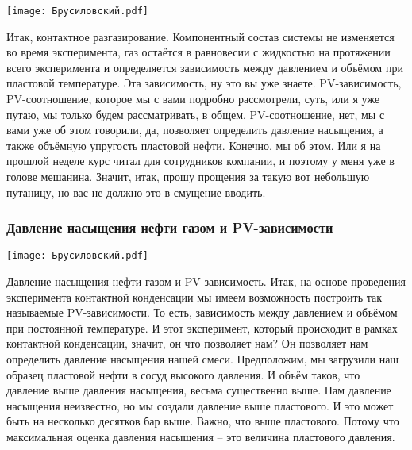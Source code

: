 \documentclass[main.tex]{subfiles}
\begin{document}
\begin{center}
\texttt{[image: Брусиловский.pdf]}
\end{center}

Итак, контактное разгазирование.
Компонентный состав системы не изменяется во время эксперимента, газ остаётся в равновесии с жидкостью на протяжении всего эксперимента и определяется зависимость между давлением и объёмом при пластовой температуре.
Эта зависимость, ну это вы уже знаете.
PV-зависимость, PV-соотношение, которое мы с вами подробно рассмотрели, суть, или я уже путаю, мы только будем рассматривать, в общем, PV-соотношение, нет, мы с вами уже об этом говорили, да, позволяет определить давление насыщения, а также объёмную упругость пластовой нефти.
Конечно, мы об этом.
Или я на прошлой неделе курс читал для сотрудников компании, и поэтому у меня уже в голове мешанина.
Значит, итак, прошу прощения за такую вот небольшую путаницу, но вас не должно это в смущение вводить.

\subsubsection{Давление насыщения нефти газом и PV-зависимости}

\begin{center}
\texttt{[image: Брусиловский.pdf]}
\end{center}

Давление насыщения нефти газом и PV-зависимость.
Итак, на основе проведения эксперимента контактной конденсации мы имеем возможность построить так называемые PV-зависимости.
То есть, зависимость между давлением и объёмом при постоянной температуре.
И этот эксперимент, который происходит в рамках контактной конденсации, значит, он что позволяет нам?
Он позволяет нам определить давление насыщения нашей смеси.
Предположим, мы загрузили наш образец пластовой нефти в сосуд высокого давления.
И объём таков, что давление выше давления насыщения, весьма существенно выше.
Нам давление насыщения неизвестно, но мы создали давление выше пластового.
И это может быть на несколько десятков бар выше.
Важно, что выше пластового.
Потому что максимальная оценка давления насыщения -- это величина пластового давления.
\end{document}

